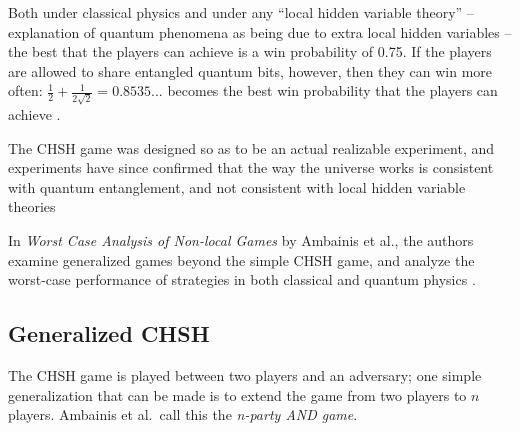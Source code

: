 Both under classical physics and under any ``local hidden variable theory'' -- explanation of quantum phenomena as being due to extra local hidden variables -- the best that the players can achieve is a win probability of 0.75. If the players are allowed to share entangled quantum bits, however, then they can win more often: $\frac12 + \frac1{2\sqrt2} = 0.8535$... becomes the best win probability that the players can achieve \cite{ABBSSV,CHSH}.

The CHSH game was designed so as to be an actual realizable experiment, and experiments have since confirmed that the way the universe works is consistent with quantum entanglement, and not consistent with local hidden variable theories \cite{aspect}

In \emph{Worst Case Analysis of Non-local Games} by Ambainis et al., the authors examine generalized games beyond the simple CHSH game, and analyze the worst-case performance of strategies in both classical and quantum physics \cite{ABBSSV}.

\subsection{Generalized CHSH}

The CHSH game is played between two players and an adversary; one simple generalization that can be made is to extend the game from two players to $n$ players. Ambainis et al.~call this the \emph{n-party AND game}.


